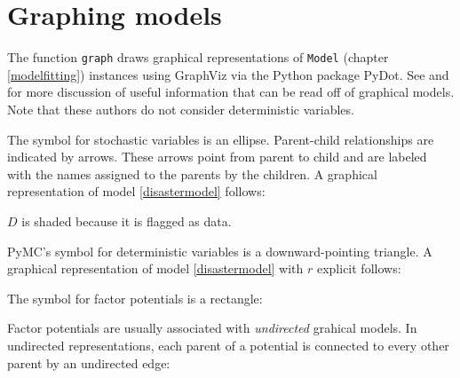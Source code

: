 \hypertarget{graphical}{}
\section*{Graphing models} \label{graphical}

The function \texttt{graph} draws graphical representations of \texttt{Model} (chapter \ref{modelfitting}) instances using GraphViz via the Python package PyDot. See \cite{dawidmarkov} and \cite{jordangraphical} for more discussion of useful information that can be read off of graphical models. Note that these authors do not consider deterministic variables.

The symbol for stochastic variables is an ellipse. Parent-child relationships are indicated by arrows. These arrows point from parent to child and are labeled with the names assigned to the parents by the children. A graphical representation of model \ref{disastermodel} follows:
\begin{center}
\end{center} 
$D$ is shaded because it is flagged as data.

PyMC's symbol for deterministic variables is a downward-pointing triangle. A graphical representation of model \ref{disastermodel} with $r$ explicit follows:
\begin{center}
\end{center}

The symbol for factor potentials is a rectangle:
\begin{center}
\end{center}
Factor potentials are usually associated with \emph{undirected} grahical models. In undirected representations, each parent of a potential is connected to every other parent by an undirected edge:
\begin{center}
\end{center}


